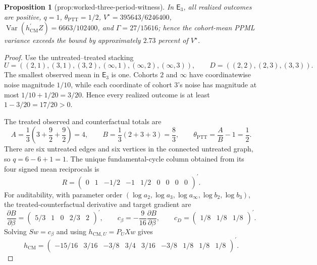 \documentclass{article}
\newtheorem{proposition}{Proposition}
\begin{document}
\begin{proposition}[prop:worked-three-period-witness]\label{prop:worked-three-period-witness}
In \(\mathsf E_3\), all realized outcomes are positive, \(q=1\), \(\theta_{\mathrm{PTT}}=1/2\), \(V^{\star}=395643/6246400\), \(\operatorname{Var}(h_{\mathrm{CM}}^{\prime}Z)=6663/102400\), and \(\Gamma=27/15616\); hence the cohort-mean PPML variance exceeds the bound by approximately \(2.73\) percent of \(V^{\star}\).
\end{proposition}
\begin{proof}
Use the untreated--treated stacking
\[
U=((2,1),(3,1),(3,2),(\infty,1),(\infty,2),(\infty,3)),
\qquad
D=((2,2),(2,3),(3,3)).                                                    \tag{1}
\]
The smallest observed mean in \(\mathsf E_3\) is one.  Cohorts \(2\) and \(\infty\) have coordinatewise noise magnitude \(1/10\), while each coordinate of cohort \(3\)'s noise has magnitude at most
\(1/10+1/20=3/20\).  Hence every realized outcome is at least
\(1-3/20=17/20>0\).

The treated observed and counterfactual totals are
\[
A=\frac13\left(3+\frac92+\frac92\right)=4,
\qquad
B=\frac13(2+3+3)=\frac83,
\qquad
\theta_{\mathrm{PTT}}=\frac{A}{B}-1=\frac12.                           \tag{2}
\]
There are six untreated edges and six vertices in the connected untreated graph, so
\(q=6-6+1=1\).  The unique fundamental-cycle column obtained from its four signed mean reciprocals is
\[
R=
\begin{pmatrix}
0&1&-1/2&-1&1/2&0&0&0&0
\end{pmatrix}^{\prime}.                                                  \tag{3}
\]
For auditability, with parameter order
\((\log a_2,\log a_3,\log a_\infty,\log b_2,\log b_3)\), the treated-counterfactual derivative and target gradient are
\[
\frac{\partial B}{\partial\beta}
=\begin{pmatrix}5/3&1&0&2/3&2\end{pmatrix}^{\prime},
\qquad
c_\beta=-\frac9{16}\frac{\partial B}{\partial\beta},
\qquad
c_D=\begin{pmatrix}1/8&1/8&1/8\end{pmatrix}^{\prime}.                  \tag{4}
\]
Solving \(S w=c_\beta\) and using
\(h_{\mathrm{CM},U}=P_UXw\) gives
\[
h_{\mathrm{CM}}=
\begin{pmatrix}
-15/16&3/16&-3/8&3/4&3/16&-3/8&1/8&1/8&1/8
\end{pmatrix}^{\prime}.                                                  \tag{5}
\]


\end{proof}
\end{document}
